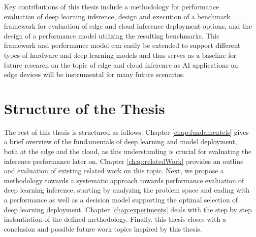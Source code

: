 Key contributions of this thesis include a methodology for performance evaluation of deep learning inference, design and execution of a benchmark framework for evaluation of edge and cloud inference deployment options, and the design of a performance model utilizing the resulting benchmarks.
This framework and performance model can easily be extended to support different types of hardware and deep learning models and thus serves as a baseline for future research on the topic of edge and cloud inference as AI applications on edge devices will be instrumental for many future scenarios.



\section{Structure of the Thesis}
The rest of this thesis is structured as follows: 
Chapter \ref{chap:fundamentels} gives a brief overview of the fundamentals of deep learning and model deployment, both at the edge and the cloud, as this understanding is crucial for evaluating the inference performance later on.
Chapter \ref{chap:relatedWork} provides an outline and evaluation of existing related work on this topic. 
Next, we propose a methodology towards a systematic approach towards performance evaluation of deep learning inference, starting by analyzing the problem space and ending with a performance as well as a decision model supporting the optimal selection of deep learning deployment.
Chapter \ref{chap:experiments} deals with the step by step instantiation of the defined methodology.
Finally, this thesis closes with a conclusion and possible future work topics inspired by this thesis.
